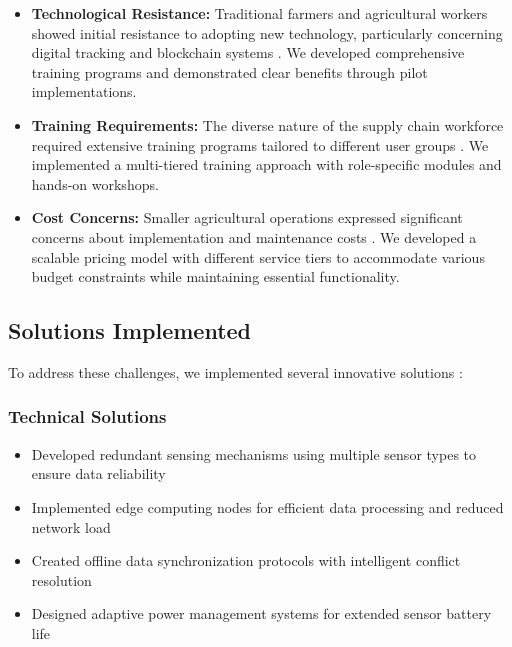 \documentclass[conference]{IEEEtran}
\begin{document}
\begin{itemize}
    \item \textbf{Technological Resistance:} Traditional farmers and agricultural workers showed initial resistance to adopting new technology, particularly concerning digital tracking and blockchain systems \cite{makario2021bluetooth}. We developed comprehensive training programs and demonstrated clear benefits through pilot implementations.
    
    \item \textbf{Training Requirements:} The diverse nature of the supply chain workforce required extensive training programs tailored to different user groups \cite{tharatipyakul2021user}. We implemented a multi-tiered training approach with role-specific modules and hands-on workshops.
    
    \item \textbf{Cost Concerns:} Smaller agricultural operations expressed significant concerns about implementation and maintenance costs \cite{rosero2023smart}. We developed a scalable pricing model with different service tiers to accommodate various budget constraints while maintaining essential functionality.
\end{itemize}

\subsection{Solutions Implemented}
To address these challenges, we implemented several innovative solutions \cite{ahmed2024optimized}:

\subsubsection{Technical Solutions}
\begin{itemize}
    \item Developed redundant sensing mechanisms using multiple sensor types to ensure data reliability \cite{rayhana2021rfid}
    \item Implemented edge computing nodes for efficient data processing and reduced network load \cite{hernandez2024implementation}
    \item Created offline data synchronization protocols with intelligent conflict resolution \cite{al2021prochain}
    \item Designed adaptive power management systems for extended sensor battery life \cite{elbeheiry2023technologies}
\end{itemize}
\end{document}
